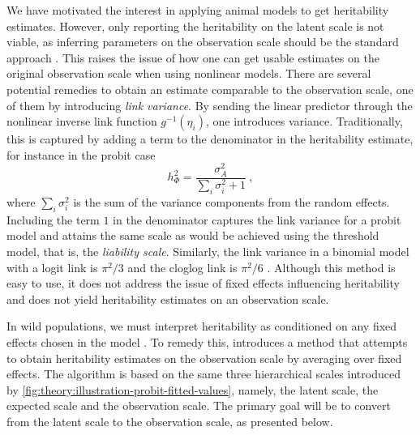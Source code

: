 We have motivated the interest in applying animal models %
to get heritability estimates. However, only reporting the heritability on the latent scale is not viable, as inferring parameters on the observation scale should be the standard approach \autocite{de2018quantitative}. This raises the issue of how one can get usable estimates on the original observation scale when using nonlinear models.
There are several potential remedies to obtain an estimate comparable to the observation scale, one of them by introducing \textit{ link variance}. By sending the linear predictor through the nonlinear inverse link function $g^{-1}(\eta_i)$, one introduces variance. Traditionally, this is captured by adding a term to the denominator in the heritability estimate, for instance in the probit case
\begin{equation}
    h^2_{\Phi} = \frac{\sigma^2_A}{\sum_i \sigma^2_i +1} \ ,
    \label{eq:link variance h2 phi}
\end{equation}
where $\sum_i \sigma^2_i$ is the sum of the variance components from the random effects. Including the term $1$ in the denominator captures the link variance for a probit model and attains the same scale as would be achieved using the threshold model, that is, the \textit{liability scale}. Similarly, the link variance in a binomial model with a logit link is $\pi^2/3$ and the cloglog link is $\pi^2/6$ \autocite{nakagawa2017}. Although this method is easy to use, it does not address the issue of fixed effects influencing heritability and does not yield heritability estimates on an observation scale.

In wild populations, we must interpret heritability as conditioned on any fixed effects chosen in the model \autocite{wilson2008}. To remedy this, \textcite{de2016general} introduces a method that attempts to obtain heritability estimates on the observation scale by averaging over fixed effects. The algorithm is based on the same three hierarchical scales introduced by \autoref{fig:theory:illustration-probit-fitted-values}, namely, the latent scale, the expected scale and the observation scale.
The primary goal will be to convert from the latent scale to the observation scale, as presented below. 

